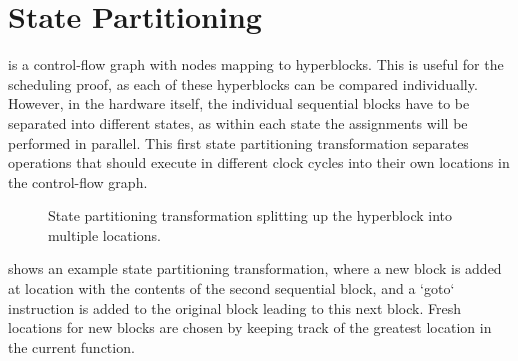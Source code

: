 \section{State Partitioning}%
\label{sec:hg:state-partitioning}

\rtlpar{} is a control-flow graph with nodes mapping to hyperblocks.  This is
useful for the scheduling proof, as each of these hyperblocks can be compared
individually.  However, in the hardware itself, the individual sequential blocks
have to be separated into different states, as within each state the
assignments will be performed in parallel.  This first state partitioning
transformation separates operations that should execute in different clock
cycles into their own locations in the control-flow graph.

\begin{figure}
  \centering
  \caption{State partitioning transformation splitting up the hyperblock into
    multiple locations.}%
  \label{fig:hg:state-partitioning}
\end{figure}

 shows an example state partitioning
transformation, where a new block is added at location  with the
contents of the second sequential block, and a \rtlinline`goto` instruction is
added to the original block leading to this next block.  Fresh locations for new
blocks are chosen by keeping track of the greatest location in the current
function.

